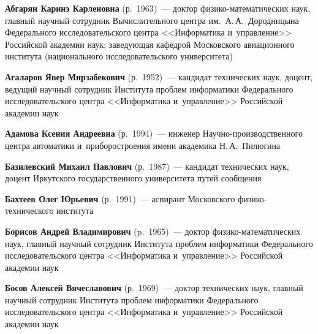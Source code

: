 \begin{multicols}{2}

\noindent
\textbf{Абгарян Каринэ Карленовна} (р.\ 1963)~--- 
доктор фи\-зи\-ко-ма\-те\-ма\-ти\-че\-ских 
наук, главный научный сотрудник Вычислительного 
центра им.\ А.\,А.~Дородницына 
Федерального исследовательского центра\linebreak
 <<Информатика и~управ\-ле\-ние>> Российской 
академии наук; за\-ве\-ду\-ющая кафедрой Московского авиационного института (национального 
исследовательского университета)

\vspace*{3pt}

\noindent
\textbf{Агаларов Явер Мирзабекович} (р.\ 1952)~--- кандидат технических наук, доцент, ведущий 
научный сотрудник Института проб\-лем информатики Федерального исследовательского центра 
<<Информатика и~управ\-ле\-ние>> Российской академии наук

\vspace*{3pt}

\noindent
\textbf{Адамова Ксения Андреевна} (р.\ 1994)~--- инженер 
На\-уч\-но-про\-из\-вод\-ст\-вен\-но\-го центра автоматики и~приборостроения имени академика Н.\,А.~Пилюгина

\vspace*{3pt}

\noindent
\textbf{Базилевский Михаил Павлович} (р.\ 1987)~--- кандидат технических наук, доцент 
Иркутского государственного университета путей сообщения %

\vspace*{3pt}

\noindent
\textbf{Бахтеев Олег Юрьевич} (р.\ 1991)~--- аспирант Московского физико-технического 
института

\vspace*{3pt}

\noindent
\textbf{Борисов Андрей Владимирович} (p.\ 1965)~--- доктор 
фи\-зи\-ко-ма\-те\-ма\-ти\-че\-ских 
наук, главный научный сотрудник Института проб\-лем информатики 
Федерального исследовательского центра <<Информатика и~управление>> 
Российской академии наук

\vspace*{3pt}

\noindent
\textbf{Босов Алексей Вячеславович} (р.\ 1969)~--- доктор технических наук, главный научный 
сотрудник Института проблем информатики Федерального исследовательского центра 
<<Информатика и~управление>> Российской академии наук


\end{multicols}
